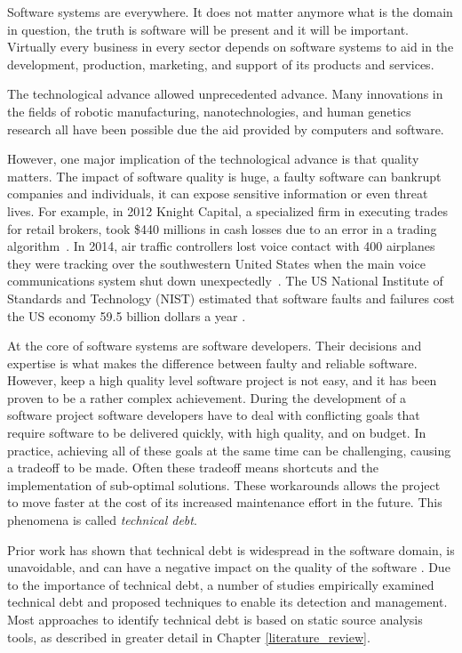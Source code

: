 
Software systems are everywhere. It does not matter anymore what is the domain in question, the truth is software will be present and it will be important. Virtually every business in every sector depends on software systems to aid in the development, production, marketing, and support of its products and services. 

The technological advance allowed unprecedented advance. Many innovations in the fields of robotic manufacturing, nanotechnologies, and human genetics research all have been possible due the aid provided by computers and software.

However, one major implication of the technological advance is that quality matters. The impact of software quality is huge, a faulty software can bankrupt companies and individuals, it can expose sensitive information or even threat lives. For example, in 2012 Knight Capital, a specialized firm in executing trades for retail brokers, took \$440 millions in cash losses due to an error in a trading algorithm~\cite{Register:trading_algorithm}. In 2014, air traffic controllers lost voice contact with 400 airplanes they were tracking over the southwestern United States when the main voice communications system shut down unexpectedly~\cite{IEEESpectrum:airtraffic}. The US National Institute of Standards and Technology (NIST) estimated that software faults and failures cost the US economy 59.5 billion dollars a year \cite{NIST:economic_impacts}. 

At the core of software systems are software developers. Their decisions and expertise is what makes the difference between faulty and reliable software. However, keep a high quality level software project is not easy, and it has been proven to be a rather complex achievement. During the development of a software project software developers have to deal with conflicting goals that require software to be delivered quickly, with high quality, and on budget. In practice, achieving all of these goals at the same time can be challenging, causing a tradeoff to be made. Often these tradeoff means shortcuts and the implementation of sub-optimal solutions. These workarounds allows the project to move faster at the cost of its increased maintenance effort in the future. This phenomena is called \emph{technical debt}. 

Prior work has shown that technical debt is widespread in the software domain, is unavoidable, and can have a negative impact on the quality of the software \cite{Lim2012Software}. Due to the importance of technical debt, a number of studies empirically examined technical debt and proposed techniques to enable its detection and management. Most approaches to identify technical debt is based on static source analysis tools, as described in greater detail in Chapter \ref{literature_review}. 

